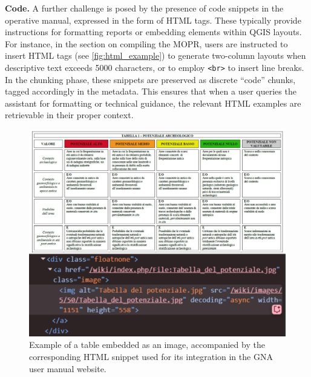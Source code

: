 \begin{spacing}{1.5}
\textbf{Code. }A further challenge is posed by the presence of code snippets in the operative manual, expressed in the form of HTML tags. These typically provide instructions for formatting reports or embedding elements within QGIS layouts. For instance, in the section on compiling the MOPR, users are instructed to insert HTML tags (see \autoref{fig:html_example}) to generate two-column layouts when descriptive text exceeds 5000 characters, or to employ \texttt{<br>} to insert line breaks. In the chunking phase, these snippets are preserved as discrete ``code'' chunks, tagged accordingly in the metadata. This ensures that when a user queries the assistant for formatting or technical guidance, the relevant HTML examples are retrievable in their proper context.\\

\begin{figure}[H]
  \centering
  \includegraphics[width=\textwidth]{images/merged.jpg} 
  \caption{Example of a table embedded as an image, accompanied by the corresponding HTML snippet used for its integration in the GNA user manual website.}
  \label{fig:example_image}
\end{figure}


\end{spacing}
